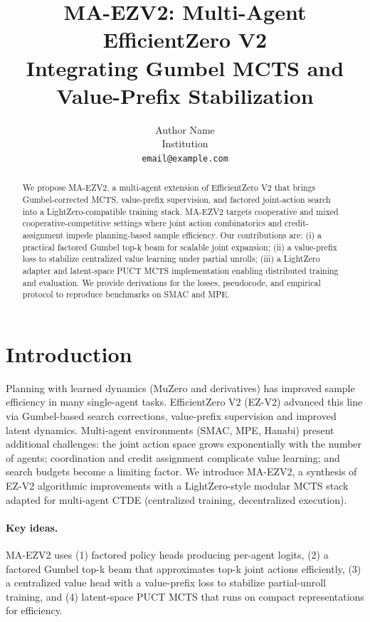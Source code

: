 \documentclass[10pt]{article}
\title{MA-EZV2: Multi-Agent EfficientZero V2 \\ Integrating Gumbel MCTS and Value-Prefix Stabilization}
\author{Author Name \\ Institution \\ \texttt{email@example.com}}
\date{}
\begin{document}
\maketitle

\begin{abstract}
We propose MA-EZV2, a multi-agent extension of EfficientZero V2 that brings Gumbel-corrected MCTS, value-prefix supervision, and factored joint-action search into a LightZero-compatible training stack. MA-EZV2 targets cooperative and mixed cooperative-competitive settings where joint action combinatorics and credit-assignment impede planning-based sample efficiency. Our contributions are: (i) a practical factored Gumbel top-k beam for scalable joint expansion; (ii) a value-prefix loss to stabilize centralized value learning under partial unrolls; (iii) a LightZero adapter and latent-space PUCT MCTS implementation enabling distributed training and evaluation. We provide derivations for the losses, pseudocode, and empirical protocol to reproduce benchmarks on SMAC and MPE.
\end{abstract}

\section{Introduction}
Planning with learned dynamics (MuZero and derivatives) has improved sample efficiency in many single-agent tasks. EfficientZero V2 (EZ-V2) advanced this line via Gumbel-based search corrections, value-prefix supervision and improved latent dynamics. Multi-agent environments (SMAC, MPE, Hanabi) present additional challenges: the joint action space grows exponentially with the number of agents; coordination and credit assignment complicate value learning; and search budgets become a limiting factor. We introduce MA-EZV2, a synthesis of EZ-V2 algorithmic improvements with a LightZero-style modular MCTS stack adapted for multi-agent CTDE (centralized training, decentralized execution).

\paragraph{Key ideas.} MA-EZV2 uses (1) factored policy heads producing per-agent logits, (2) a factored Gumbel top-k beam that approximates top-k joint actions efficiently, (3) a centralized value head with a value-prefix loss to stabilize partial-unroll training, and (4) latent-space PUCT MCTS that runs on compact representations for efficiency.
\end{document}
